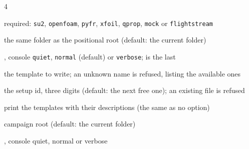 \vspace{-3pt}
\fontsize{6.7}{7.5}\selectfont
\begin{multicols}{4}

\begin{flags}
\item {} required: \texttt{su2}, \texttt{openfoam}, \texttt{pyfr}, \texttt{xfoil}, \texttt{qprop}, \texttt{mock} or \texttt{flightstream}
\item {} the same folder as the positional root (default: the current folder)
\item {},  console \texttt{quiet}, \texttt{normal} (default) or \texttt{verbose};  is the last
\end{flags}
\begin{flags}
\item {} the template to write; an unknown name is refused, listing the available ones
\item {} the setup id, three digits (default: the next free one); an existing file is refused
\item {} print the templates with their descriptions (the same as no option)
\item {} campaign root (default: the current folder)
\item {},  console quiet, normal or verbose
\end{flags}


\end{multicols}

